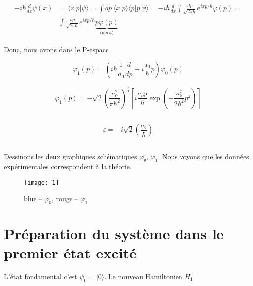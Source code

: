 \documentclass[a4paper,12pt]{article}
\begin{document}
\begin{equation}
	\begin{aligned}
		\displaystyle -i\hbar\frac{d}{dx}\psi (x)&=\langle x|p|\psi \rangle =\int \!\!dp~\langle x|p\rangle \langle p|p|\psi \rangle =-i\hbar\frac{d}{dx}\int \!\!\frac{dp}{{\sqrt {2\pi \hbar }}}{e^{ixp/\hbar }{{\varphi }}(p)} {=} \\ 
		&\int \!\!\frac{dp}{{\sqrt {2\pi \hbar }}}{e^{ixp/\hbar }\underbrace{p\varphi(p)}_{\langle p|p|\psi \rangle}} 
	\end{aligned}
\end{equation}

Donc, nous avons dans le P-espace

\begin{equation}\label{eq}
		\varphi_1(p){=} \left( i\hbar\frac1{a_0}\frac{d}{dp} - i \frac{a_0} {\hbar}p \right)\varphi_0(p)
\end{equation}

\begin{equation}
	\varphi_1(p) = -\sqrt 2\left(\frac{a_0^2}{\pi \hbar^2}\right)^{\frac14}\left[i\frac{a_op}{\hbar}\exp\left(-\frac{a_0^2}{2\hbar^2}p^2\right)\right]
\end{equation}

\subsection{}


\begin{equation}\label{key}
	\varepsilon = -i\sqrt 2\left(\frac{a_0}{\hbar}\right)
\end{equation}

\subsection{}
Dessinons les deux graphiques schématiques $\varphi_0$, $\varphi_1$. Nous voyons que les données expérimentales correspondent à la théorie. 

\begin{figure}
	\centering
	\texttt{[image: 1]}
	\caption{blue – $\varphi_0$, rouge – $\varphi_1$ }
	\label{fig:image}
\end{figure}

\section{Préparation du système dans le premier état excité}
L'état fondamental c'est $\psi_0 = |0\rangle$. Le nouveau Hamiltonien $H_1$
\end{document}
